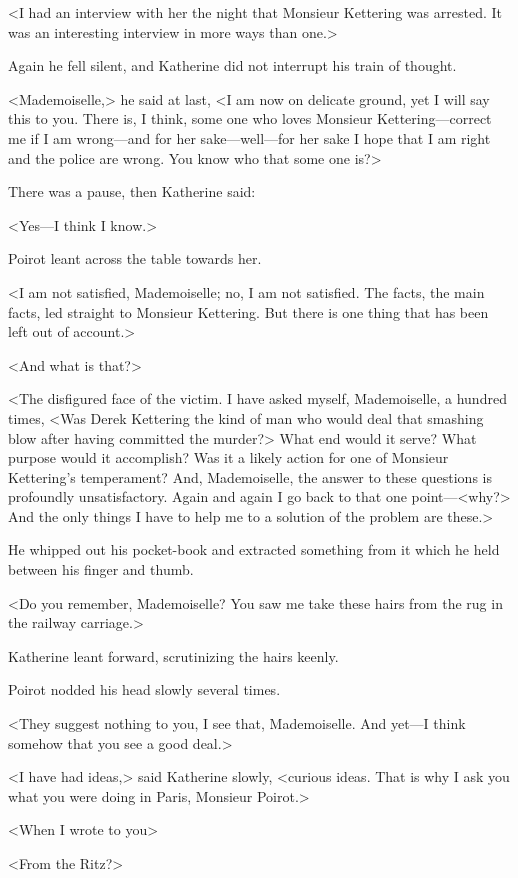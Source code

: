 <I had an interview with her the night that Monsieur Kettering was arrested. It was an interesting interview in more ways than one.>

Again he fell silent, and Katherine did not interrupt his train of thought.

<Mademoiselle,> he said at last, <I am now on delicate ground, yet I will say this to you. There is, I think, some one who loves Monsieur Kettering—correct me if I am wrong—and for her sake—well—for her sake I hope that I am right and the police are wrong. You know who that some one is?>

There was a pause, then Katherine said:

<Yes—I think I know.>

Poirot leant across the table towards her.

<I am not satisfied, Mademoiselle; no, I am not satisfied. The facts, the main facts, led straight to Monsieur Kettering. But there is one thing that has been left out of account.>

<And what is that?>

<The disfigured face of the victim. I have asked myself, Mademoiselle, a hundred times, <Was Derek Kettering the kind of man who would deal that smashing blow after having committed the murder?> What end would it serve? What purpose would it accomplish? Was it a likely action for one of Monsieur Kettering's temperament? And, Mademoiselle, the answer to these questions is profoundly unsatisfactory. Again and again I go back to that one point—<why?> And the only things I have to help me to a solution of the problem are these.>

He whipped out his pocket-book and extracted something from it which he held between his finger and thumb.

<Do you remember, Mademoiselle? You saw me take these hairs from the rug in the railway carriage.>

Katherine leant forward, scrutinizing the hairs keenly.

Poirot nodded his head slowly several times.

<They suggest nothing to you, I see that, Mademoiselle. And yet—I think somehow that you see a good deal.>

<I have had ideas,> said Katherine slowly, <curious ideas. That is why I ask you what you were doing in Paris, Monsieur Poirot.>

<When I wrote to you\longdash>

<From the Ritz?>

